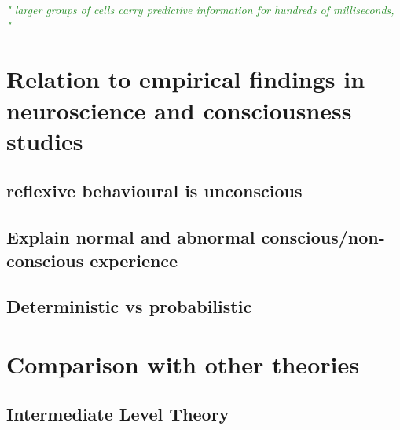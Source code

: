 \documentclass[utf8]{article}
\newcommand{\rewrite}[1]{\textcolor{ForestGreen}{\textit{"#1"}}}
\begin{document}
		\rewrite{ larger groups of cells carry predictive information for hundreds of milliseconds, }
		

	\section{Relation to empirical findings in neuroscience and consciousness studies}
		\subsection{reflexive behavioural is unconscious}
		
		\subsection{Explain normal and abnormal conscious/non-conscious experience}
		
		
		
		
			
		\subsection{Deterministic vs probabilistic}
		\cite{dehaene2017consciousness}
		\cite{vul2008temporal, moreno2011bayesian, asplund2014attentional, vul2009attention}
		
	\section{Comparison with other theories}
		\subsection{Intermediate Level Theory}
		
			\cite{jackendoff1987consciousness}
			\cite{prinz2007intermediate}
			
\end{document}
